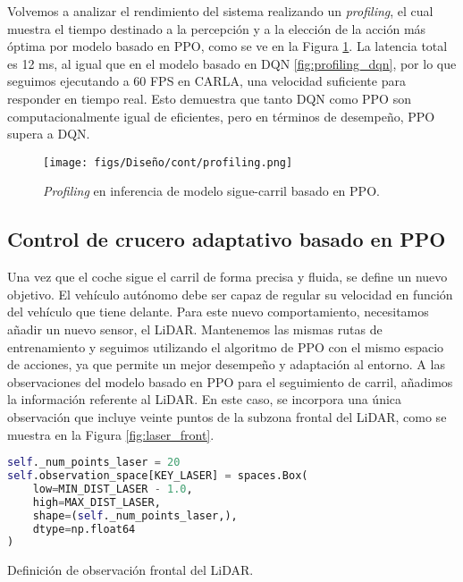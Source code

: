 Volvemos a analizar el rendimiento del sistema realizando un \textit{profiling}, el cual muestra el tiempo destinado a la percepción y a la elección de la acción más óptima por modelo basado en \ac{PPO}, como se ve en la Figura \ref{fig:profiling_ppo}. La latencia total es 12 ms, al igual que en el modelo basado en \ac{DQN} \ref{fig:profiling_dqn}, por lo que seguimos ejecutando a 60 \ac{FPS} en CARLA, una velocidad suficiente para responder en tiempo real. Esto demuestra que tanto \ac{DQN} como \ac{PPO} son computacionalmente igual de eficientes, pero en términos de desempeño, \ac{PPO} supera a \ac{DQN}.

\begin{figure}[ht]
\centering
\texttt{[image: figs/Diseño/cont/profiling.png]}
\caption{\textit{Profiling} en inferencia de modelo sigue-carril basado en \ac{PPO}.}
\label{fig:profiling_ppo}
\end{figure}

\subsection{Control de crucero adaptativo basado en \ac{PPO}}

Una vez que el coche sigue el carril de forma precisa y fluida, se define un nuevo objetivo. El vehículo autónomo debe ser capaz de regular su velocidad en función del vehículo que tiene delante. Para este nuevo comportamiento, necesitamos añadir un nuevo sensor, el \ac{LiDAR}. Mantenemos las mismas rutas de entrenamiento y seguimos utilizando el algoritmo de \ac{PPO} con el mismo espacio de acciones, ya que permite un mejor desempeño y adaptación al entorno. A las observaciones del modelo basado en \ac{PPO} para el seguimiento de carril, añadimos la información referente al \ac{LiDAR}. En este caso, se incorpora una única observación que incluye veinte puntos de la subzona frontal del \ac{LiDAR}, como se muestra en la Figura \ref{fig:laser_front}.

\begin{code}[h]
\begin{lstlisting}[language=Python]
self._num_points_laser = 20
self.observation_space[KEY_LASER] = spaces.Box(
	low=MIN_DIST_LASER - 1.0,
	high=MAX_DIST_LASER,
	shape=(self._num_points_laser,),
	dtype=np.float64
)
\end{lstlisting}
\caption[Definición de observación frontal del \ac{LiDAR}]{Definición de observación frontal del \ac{LiDAR}.}
\label{cod:obs_laser_front}
\end{code}

